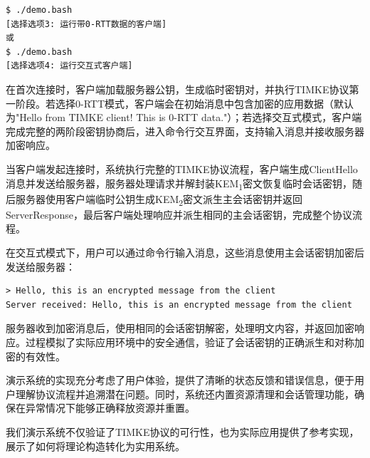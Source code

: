 \begin{verbatim}
$ ./demo.bash
[选择选项3: 运行带0-RTT数据的客户端]
或
$ ./demo.bash
[选择选项4: 运行交互式客户端]
\end{verbatim}

在首次连接时，客户端加载服务器公钥，生成临时密钥对，并执行TIMKE协议第一阶段。若选择0-RTT模式，客户端会在初始消息中包含加密的应用数据（默认为"Hello from TIMKE client! This is 0-RTT data."）；若选择交互式模式，客户端完成完整的两阶段密钥协商后，进入命令行交互界面，支持输入消息并接收服务器加密响应。

当客户端发起连接时，系统执行完整的TIMKE协议流程，客户端生成ClientHello消息并发送给服务器，服务器处理请求并解封装KEM\textsubscript{1}密文恢复临时会话密钥，随后服务器使用客户端临时公钥生成KEM\textsubscript{2}密文派生主会话密钥并返回ServerResponse，最后客户端处理响应并派生相同的主会话密钥，完成整个协议流程。

在交互式模式下，用户可以通过命令行输入消息，这些消息使用主会话密钥加密后发送给服务器：

\begin{verbatim}
> Hello, this is an encrypted message from the client
Server received: Hello, this is an encrypted message from the client
\end{verbatim}

服务器收到加密消息后，使用相同的会话密钥解密，处理明文内容，并返回加密响应。过程模拟了实际应用环境中的安全通信，验证了会话密钥的正确派生和对称加密的有效性。

演示系统的实现充分考虑了用户体验，提供了清晰的状态反馈和错误信息，便于用户理解协议流程并追溯潜在问题。同时，系统还内置资源清理和会话管理功能，确保在异常情况下能够正确释放资源并重置。

我们演示系统不仅验证了TIMKE协议的可行性，也为实际应用提供了参考实现，展示了如何将理论构造转化为实用系统。